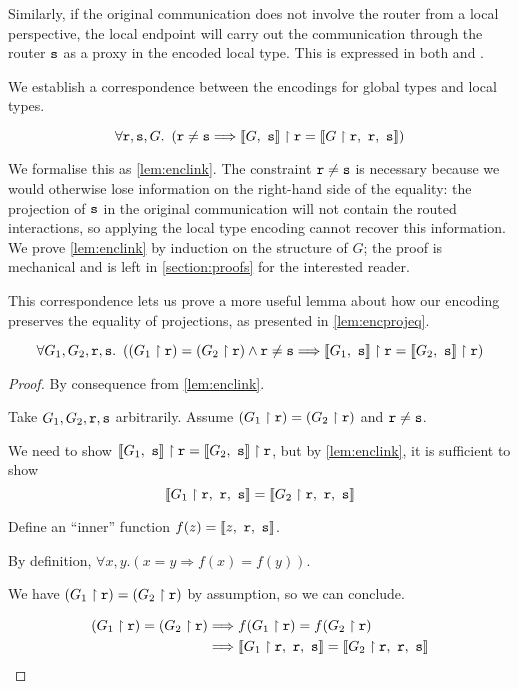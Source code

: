 Similarly, if the original communication does not involve
the router from a local perspective, the local endpoint
will carry out the communication through the router
$\texttt{s}$ as a proxy in the encoded local type.
This is expressed in both 
and .

We establish a correspondence between the encodings for
global types and local types.

\[
\forall {\mathtt{r}}, {\mathtt{s}}, G. ~ \left(
{\mathtt{r}} \neq {\mathtt{s}} 
	\Longrightarrow
{ \llbracket {G},~ {\mathtt{s}}  \rrbracket } \upharpoonright {\mathtt{r}} = \llbracket { {G} \upharpoonright {\mathtt{r}}  },~{\mathtt{r}},~{\mathtt{s}} \rrbracket
\right)
\]

We formalise this as \cref{lem:enclink}.
The constraint ${\mathtt{r}} \neq {\mathtt{s}}$ is necessary
because we would otherwise lose information on the right-hand
side of the equality:
the projection of ${\mathtt{s}}$ in the original
communication will not contain the routed interactions,
so applying the local type encoding cannot recover this 
information.
We prove \cref{lem:enclink} by induction on the structure of $G$;
the proof is mechanical and is left in \cref{section:proofs}
for the interested reader.

This correspondence lets us prove a more useful 
lemma about how our encoding preserves the equality of projections,
as presented in \cref{lem:encprojeq}.

\begin{lemma}
\[
\forall G_1, G_2, {\mathtt{r}}, {\mathtt{s}}. ~ \left(
({G_1} \upharpoonright {\mathtt{r}}) = ({G_2} \upharpoonright {\mathtt{r}}) \wedge {\mathtt{r}} \neq {\mathtt{s}}
	\Longrightarrow
{ \llbracket {G_1},~ {\mathtt{s}}  \rrbracket } \upharpoonright {\mathtt{r}} = {\llbracket {G_2},~{\mathtt{s}} \rrbracket} \upharpoonright {\mathtt{r}}
\right)
\]

\label{lem:encprojeq}
\end{lemma}

\begin{proof} By consequence from \cref{lem:enclink}.

Take $G_1, G_2, {\mathtt{r}}, {\mathtt{s}}$ arbitrarily. 
Assume $({G_1} \upharpoonright {\mathtt{r}}) = ({G_2} \upharpoonright {\mathtt{r}})$ and ${\mathtt{r}} \neq {\mathtt{s}}$.

We need to show ${\llbracket {G_1},~{\mathtt{s}} \rrbracket} \upharpoonright {\mathtt{r}} = {\llbracket {G_2},~{\mathtt{s}} \rrbracket} \upharpoonright {\mathtt{r}}$,
but by \cref{lem:enclink}, it is sufficient to show
\[
\llbracket { {G_1} \upharpoonright {\mathtt{r}}  },~{\mathtt{r}},~{\mathtt{s}} \rrbracket = \llbracket { {G_2} \upharpoonright {\mathtt{r}}  },~{\mathtt{r}},~{\mathtt{s}} \rrbracket
\]

Define an ``inner'' function $f(z) = \llbracket {z},~{\mathtt{r}},~{\mathtt{s}} \rrbracket$.

By definition, $\forall x, y. (x = y \Longrightarrow f(x) = f(y))$.

We have $({G_1} \upharpoonright {\mathtt{r}}) = ({G_2} \upharpoonright {\mathtt{r}})$ by assumption,
so we can conclude.

\begin{align*}
({G_1} \upharpoonright {\mathtt{r}}) = ({G_2} \upharpoonright {\mathtt{r}}) 
&\Longrightarrow f({G_1} \upharpoonright {\mathtt{r}}) = f({G_2} \upharpoonright {\mathtt{r}})  \\
&\Longrightarrow
\llbracket { {G_1} \upharpoonright {\mathtt{r}}  },~{\mathtt{r}},~{\mathtt{s}} \rrbracket = \llbracket { {G_2} \upharpoonright {\mathtt{r}}  },~{\mathtt{r}},~{\mathtt{s}} \rrbracket
\end{align*}


\end{proof}

